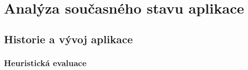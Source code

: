 \chapter{Analýza současného stavu aplikace}

\section{Historie a vývoj aplikace}


\subsection{Heuristická evaluace}




